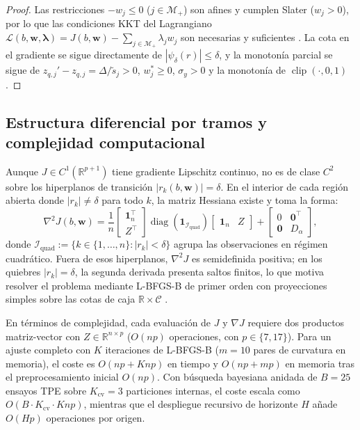 \documentclass[11pt,a4paper]{article}
\DeclareMathOperator{\clip}{clip}
\DeclareMathOperator{\diag}{diag}
\begin{document}
\begin{proof}
Las restricciones $-w_j \le 0$ ($j \in \mathcal{M}_+$) son afines y cumplen Slater ($w_j > 0$), por lo que las condiciones KKT del Lagrangiano $\mathcal{L}(b,\mathbf{w},\boldsymbol{\lambda}) = J(b,\mathbf{w}) - \sum_{j \in \mathcal{M}_+} \lambda_j w_j$ son necesarias y suficientes \cite{boyd2004convex}. La cota en el gradiente se sigue directamente de $|\psi_\delta(r)| \le \delta$, y la monotonía parcial se sigue de $z_{q,j}' - z_{q,j} = \Delta/\tilde{s}_j > 0$, $w_j^* \ge 0$, $\sigma_y > 0$ y la monotonía de $\clip(\cdot, 0, 1)$.
\end{proof}

\subsection{Estructura diferencial por tramos y complejidad computacional}

Aunque $J \in C^1(\mathbb{R}^{p+1})$ tiene gradiente Lipschitz continuo, no es de clase $C^2$ sobre los hiperplanos de transición $|r_k(b,\mathbf{w})| = \delta$. En el interior de cada región abierta donde $|r_k| \ne \delta$ para todo $k$, la matriz Hessiana existe y toma la forma:
\begin{equation}
\nabla^2 J(b,\mathbf{w}) = \frac{1}{n} \begin{bmatrix} \mathbf{1}_n^\top \\ Z^\top \end{bmatrix} \diag(\mathbf{1}_{\mathcal{I}_{\mathrm{quad}}}) \begin{bmatrix} \mathbf{1}_n & Z \end{bmatrix} + \begin{bmatrix} 0 & \mathbf{0}^\top \\ \mathbf{0} & D_\alpha \end{bmatrix},
\label{eq:sup_hessiana}
\end{equation}
donde $\mathcal{I}_{\mathrm{quad}} := \{k \in \{1,\dots,n\} : |r_k| < \delta\}$ agrupa las observaciones en régimen cuadrático. Fuera de esos hiperplanos, $\nabla^2 J$ es semidefinida positiva; en los quiebres $|r_k| = \delta$, la segunda derivada presenta saltos finitos, lo que motiva resolver el problema mediante L-BFGS-B de primer orden con proyecciones simples sobre las cotas de caja $\mathbb{R} \times \mathcal{C}$ \cite{byrd1995lbfgsb,zhu1997lbfgsb}.

En términos de complejidad, cada evaluación de $J$ y $\nabla J$ requiere dos productos matriz-vector con $Z \in \mathbb{R}^{n \times p}$ ($O(np)$ operaciones, con $p \in \{7,17\}$). Para un ajuste completo con $K$ iteraciones de L-BFGS-B ($m=10$ pares de curvatura en memoria), el coste es $O(np + Knp)$ en tiempo y $O(np + mp)$ en memoria tras el preprocesamiento inicial $O(np)$. Con búsqueda bayesiana anidada de $B=25$ ensayos TPE sobre $K_{\mathrm{cv}}=3$ particiones internas, el coste escala como $O(B \cdot K_{\mathrm{cv}} \cdot Knp)$, mientras que el despliegue recursivo de horizonte $H$ añade $O(Hp)$ operaciones por origen.
\end{document}
